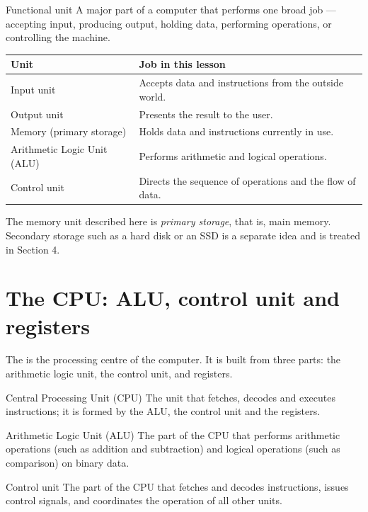 \begin{definitionbox}{Functional unit}
A major part of a computer that performs one broad job --- accepting input,
producing output, holding data, performing operations, or controlling the
machine.
\end{definitionbox}

\begin{center}
\begin{tabular}{p{}p{}}
\toprule
\textbf{Unit} & \textbf{Job in this lesson}\\
\midrule
Input unit & Accepts data and instructions from the outside world.\\
Output unit & Presents the result to the user.\\
Memory (primary storage) & Holds data and instructions currently in use.\\
Arithmetic Logic Unit (ALU) & Performs arithmetic and logical operations.\\
Control unit & Directs the sequence of operations and the flow of data.\\
\bottomrule
\end{tabular}
\end{center}

The memory unit described here is \emph{primary storage}, that is, main
memory. Secondary storage such as a hard disk or an SSD is a separate idea and
is treated in Section 4.

\section{The CPU: ALU, control unit and registers}
The  is the processing centre of the
computer. It is built from three parts: the arithmetic logic unit, the control
unit, and registers.

\begin{definitionbox}{Central Processing Unit (CPU)}
The unit that fetches, decodes and executes instructions; it is formed by the
ALU, the control unit and the registers.
\end{definitionbox}

\begin{definitionbox}{Arithmetic Logic Unit (ALU)}
The part of the CPU that performs arithmetic operations (such as addition and
subtraction) and logical operations (such as comparison) on binary data.
\end{definitionbox}

\begin{definitionbox}{Control unit}
The part of the CPU that fetches and decodes instructions, issues control
signals, and coordinates the operation of all other units.
\end{definitionbox}

